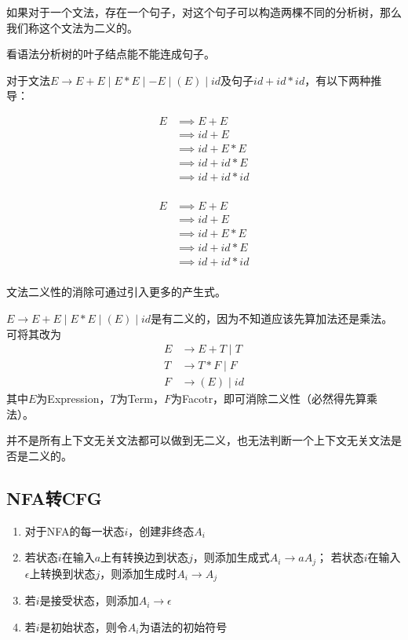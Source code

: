 \begin{definition}[二义性]
如果对于一个文法，存在一个句子，对这个句子可以构造两棵不同的分析树，那么我们称这个文法为二义的。
\end{definition}
看语法分析树的叶子结点能不能连成句子。

\begin{example}
对于文法$E\to E+E\mid E*E\mid -E\mid (E)\mid id$及句子$id+id*id$，有以下两种推导：

\begin{minipage}{0.5\linewidth}
\[\begin{aligned}
E &\implies E+E\\
&\implies id+E\\
&\implies id+E*E\\
&\implies id+id*E\\
&\implies id+id*id\\
\end{aligned}\]
\end{minipage}
\begin{minipage}{0.5\linewidth}
\[\begin{aligned}
E &\implies E+E\\
&\implies id+E\\
&\implies id+E*E\\
&\implies id+id*E\\
&\implies id+id*id\\
\end{aligned}\]
\end{minipage}
\end{example}

文法二义性的消除可通过引入更多的产生式。
\begin{example}
$E\to E+E\mid E*E\mid (E)\mid id$是有二义的，因为不知道应该先算加法还是乘法。
可将其改为
\[\begin{aligned}
E &\to E+T\mid T\\
T &\to T*F\mid F\\
F &\to (E)\mid id
\end{aligned}\]
其中$E$为Expression，$T$为Term，$F$为Facotr，即可消除二义性（必然得先算乘法）。
\end{example}

并不是所有上下文无关文法都可以做到无二义，也无法判断一个上下文无关文法是否是二义的。

\subsection{NFA转CFG}
\begin{enumerate}
	\item 对于NFA的每一状态$i$，创建非终态$A_i$
	\item 若状态$i$在输入$a$上有转换边到状态$j$，则添加生成式$A_i\to aA_j$；
	若状态$i$在输入$\epsilon$上转换到状态$j$，则添加生成时$A_i\to A_j$
	\item 若$i$是接受状态，则添加$A_i\to\epsilon$
	\item 若$i$是初始状态，则令$A_i$为语法的初始符号
\end{enumerate}

